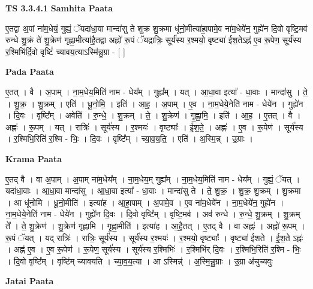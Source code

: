 \documentclass[17pt]{extarticle}
\begin{document}
\textbf{TS 3.3.4.1 } \newline
\textbf{Samhita Paata} \newline

ए॒तद्वा अ॒पां ना॑म॒धेयं॒ गुह्यं॒ ॅयदा॑धा॒वा मान्दा॑सु ते शुक्र शु॒क्रमा धू॑नो॒मीत्या॑हा॒पामे॒व ना॑म॒धेये॑न॒ गुह्ये॑न दि॒वो वृष्टि॒मव॑ रुन्धे शु॒क्रं ते॑ शु॒क्रेण॑ गृह्णा॒मीत्या॑है॒तद्वा अह्नो॑ रू॒पं ॅयद्रात्रिः॒ सूर्य॑स्य र॒श्मयो॒ वृष्ट्या॑ ईश॒तेऽह्न॑ ए॒व रू॒पेण॒ सूर्य॑स्य र॒श्मिभि॑र्दि॒वो वृष्टिं॑ च्यावय॒त्याऽस्मि॑न्नु॒ग्रा - [  ] \newline

\textbf{Pada Paata} \newline

ए॒तत् । वै । अ॒पाम् । ना॒म॒धेय॒मिति॑ नाम - धेय᳚म् । गुह्य᳚म् । यत् । आ॒धा॒वा इत्या᳚ - धा॒वाः । मान्दा॑सु । ते॒ । शु॒क्र॒ । शु॒क्रम् । एति॑ । धू॒नो॒मि॒ । इति॑ । आ॒ह॒ । अ॒पाम् । ए॒व । ना॒म॒धेये॒नेति॑ नाम - धेये॑न । गुह्ये॑न । दि॒वः । वृष्टि᳚म् । अवेति॑ । रु॒न्धे॒ । शु॒क्रम् । ते॒ । शु॒क्रेण॑ । गृ॒ह्णा॒मि॒ । इति॑ । आ॒ह॒ । ए॒तत् । वै । अह्नः॑ । रू॒पम् । यत् । रात्रिः॑ । सूर्य॑स्य । र॒श्मयः॑ । वृष्ट्याः᳚ । ई॒श॒ते॒ । अह्नः॑ । ए॒व । रू॒पेण॑ । सूर्य॑स्य । र॒श्मिभि॒रिति॑ र॒श्मि - भिः॒ । दि॒वः । वृष्टि᳚म् । च्या॒व॒य॒ति॒ । एति॑ । अ॒स्मि॒न्न् । उ॒ग्राः ।  \newline


\textbf{Krama Paata} \newline

ए॒तद् वै । वा अ॒पाम् । अ॒पाम् ना॑म॒धेय᳚म् । ना॒म॒धेय॒म् गुह्य᳚म् । ना॒म॒धेय॒मिति॑ नाम - धेय᳚म् । गुह्यं॒ ॅयत् । यदा॑धा॒वाः । आ॒धा॒वा मान्दा॑सु । आ॒धा॒वा इत्या᳚ - धा॒वाः । मान्दा॑सु ते । ते॒ शु॒क्र॒ । शु॒क्र॒ शु॒क्रम् । शु॒क्रमा । आ धू॑नोमि । धू॒नो॒मीति॑ । इत्या॑ह । आ॒हा॒पाम् । अ॒पामे॒व । ए॒व ना॑म॒धेये॑न । ना॒म॒धेये॑न॒ गुह्ये॑न । ना॒म॒धेये॒नेति॑ नाम - धेये॑न । गुह्ये॑न दि॒वः । दि॒वो वृष्टि᳚म् । वृष्टि॒मव॑ । अव॑ रुन्धे । रु॒न्धे॒ शु॒क्रम् । शु॒क्रम् ते᳚ । ते॒ शु॒क्रेण॑ । शु॒क्रेण॑ गृह्णामि । गृ॒ह्णा॒मीति॑ । इत्या॑ह । आ॒है॒तत् । ए॒तद् वै । वा अह्नः॑ । अह्नो॑ रू॒पम् । रू॒पं ॅयत् । यद् रात्रिः॑ । रात्रिः॒ सूर्य॑स्य । सूर्य॑स्य र॒श्मयः॑ । र॒श्मयो॒ वृष्ट्याः᳚ । वृष्ट्या॑ ईशते । ई॒श॒ते ऽह्नः॑ । अह्न॑ ए॒व । ए॒व रू॒पेण॑ । रू॒पेण॒ सूर्य॑स्य । सूर्य॑स्य र॒श्मिभिः॑ । र॒श्मिभि॑र् दि॒वः । र॒श्मिभि॒रिति॑ र॒श्मि - भिः॒ । दि॒वो वृष्टि᳚म् । वृष्टि॑म् च्यावयति । च्या॒व॒य॒त्या । आ ऽस्मिन्न्॑ । अ॒स्मि॒न्नु॒ग्राः । उ॒ग्रा अ॑चुच्यवुः \newline

\textbf{Jatai Paata} \newline
\end{document}
